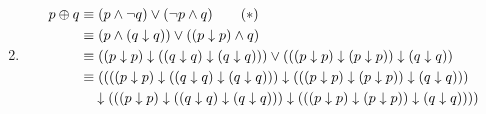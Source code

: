 \begin{solutions}
\begin{enumerate}
\begin{align*}
	\end{align*}
	\item \begin{align*}
	p \oplus q & \equiv (p \wedge \lnot q) \vee (\lnot p \wedge q) \tag{$\ast$}\\
	& \equiv (p \wedge (q \downarrow q)) \vee ((p \downarrow p) \wedge q)\\
	& \equiv ((p \downarrow p) \downarrow ((q \downarrow q) \downarrow (q \downarrow q))) \vee (((p \downarrow p) \downarrow (p \downarrow p)) \downarrow (q \downarrow q))\\
	& \equiv ((((p \downarrow p) \downarrow ((q \downarrow q) \downarrow (q \downarrow q))) \downarrow (((p \downarrow p) \downarrow (p \downarrow p)) \downarrow (q \downarrow q))) \notag\\
	& \quad \downarrow (((p \downarrow p) \downarrow ((q \downarrow q) \downarrow (q \downarrow q))) \downarrow (((p \downarrow p) \downarrow (p \downarrow p)) \downarrow (q \downarrow q))))
	\end{align*}
\end{enumerate}


\end{solutions}
